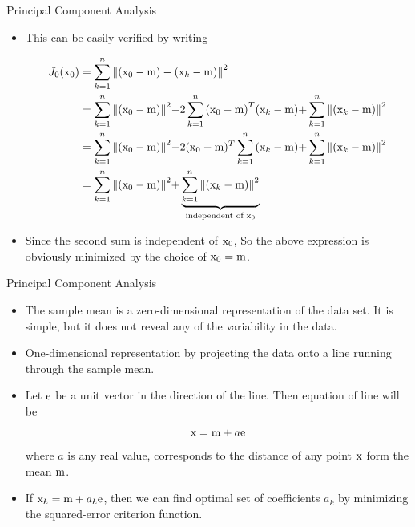 \begin{frame}{Principal Component Analysis}
\begin{itemize}
\item This can be easily verified by writing
\begin{footnotesize}
\begin{align}
{J_0}({{\rm x}_0}) &= \sum\limits_{k = 1}^n {{{\left\| {({{\rm x}_0} - {\rm m}) - ({{\rm x}_k} - {\rm m})} \right\|}^2}} \nonumber\\
& = \sum\limits_{k = 1}^n {{{\left\| {({{\rm x}_0} - {\rm m})} \right\|}^2} - } 2\sum\limits_{k = 1}^n {{{({{\rm x}_0} - {\rm m})}^T}({{\rm x}_k} - {\rm m}) + } \sum\limits_{k = 1}^n {{{\left\| {({{\rm x}_k} - {\rm m})} \right\|}^2}} \nonumber\\
& = \sum\limits_{k = 1}^n {{{\left\| {({{\rm x}_0} - {\rm m})} \right\|}^2} - } 2{({{\rm x}_0} - {\rm m})^T}\sum\limits_{k = 1}^n {({{\rm x}_k} - {\rm m}) + } \sum\limits_{k = 1}^n {{{\left\| {({{\rm x}_k} - {\rm m})} \right\|}^2}} \nonumber\\
& = \sum\limits_{k = 1}^n {{{\left\| {({{\rm x}_0} - {\rm m})} \right\|}^2} + } \underbrace {\sum\limits_{k = 1}^n {{{\left\| {({{\rm x}_k} - {\rm m})} \right\|}^2}} }_{\text{independent of }{{\rm x}_0}}\nonumber
\end{align}
\end{footnotesize}
\item Since the second sum is independent of ${\rm x_0}$, So the above expression is obviously minimized by the choice of ${\rm x}_0={\rm m}$.
\end{itemize}
\end{frame}

\begin{frame}{Principal Component Analysis}
\begin{itemize}
\item The sample mean is a zero-dimensional representation of the data set. It is simple, but it does not reveal any of the variability in the data.
\item One-dimensional representation by projecting the data onto a line running through the sample mean.
\item Let ${\rm e}$ be a unit vector in the direction of the line. Then equation of line will be
\begin{equation}
{\rm x} = {\rm m}+a{\rm e} \nonumber
\end{equation}
where $a$ is any real value, corresponds to the distance of any point ${\rm x}$ form the mean ${\rm m}$.
\item If ${\rm x}_k={\rm m}+a_k{\rm e}$, then we can find optimal set of coefficients $a_k$ by minimizing the squared-error criterion function.
\end{itemize}
\end{frame}

